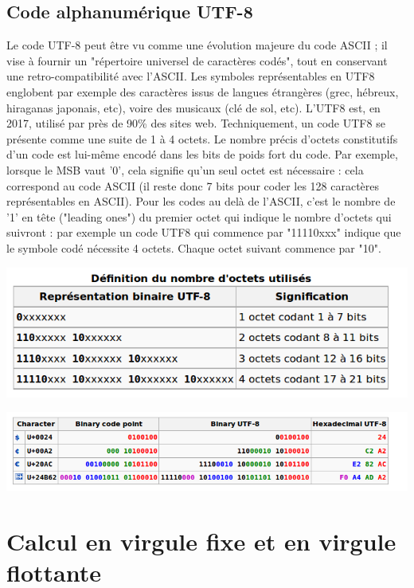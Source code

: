 \subsection{Code alphanumérique UTF-8}
Le code UTF-8 peut être vu comme une évolution majeure du code ASCII ; il vise à fournir un "répertoire universel de caractères codés", tout en conservant une retro-compatibilité avec
l'ASCII. Les symboles représentables en UTF8 englobent par exemple des caractères issus de langues étrangères (grec, hébreux, hiraganas japonais, etc), voire des musicaux (clé de sol, etc). L'UTF8 est, en 2017, utilisé par près de 90\% des sites web. Techniquement, un code UTF8 se présente comme une suite de 1 à 4 octets. Le nombre précis d'octets constitutifs
d'un code est lui-même encodé dans les bits de poids fort du code. Par exemple, lorsque le MSB vaut '0', cela signifie qu'un seul octet est nécessaire : cela correspond au code ASCII (il reste donc
7 bits pour coder les 128 caractères représentables en ASCII). Pour les codes au delà de l'ASCII, c'est le nombre de '1' en tête ("leading ones") du premier octet qui indique le nombre
d'octets qui suivront : par exemple un code UTF8 qui commence par "11110xxx" indique que le symbole codé nécessite 4 octets. Chaque octet suivant commence par "10".

\begin{center}
  \includegraphics[scale=0.5]{./figures/utf8-w.png}
\end{center}

\begin{center}
  \includegraphics[scale=0.5]{./figures/utf8-example.png}
\end{center}
\section{Calcul en virgule fixe et en virgule flottante}


